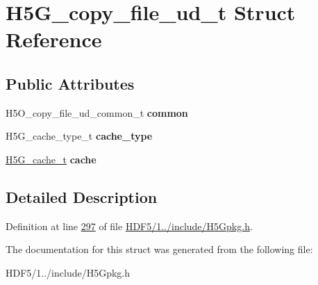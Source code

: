 \hypertarget{struct_h5_g__copy__file__ud__t}{}\section{H5\+G\+\_\+copy\+\_\+file\+\_\+ud\+\_\+t Struct Reference}
\label{struct_h5_g__copy__file__ud__t}
\subsection*{Public Attributes}
\begin{DoxyCompactItemize}
\item 
\mbox{\label{struct_h5_g__copy__file__ud__t_afb520a0b9ee20cdd295565c1ed7e0b29}} 
H5\+O\+\_\+copy\+\_\+file\+\_\+ud\+\_\+common\+\_\+t {\bfseries common}
\item 
\mbox{\label{struct_h5_g__copy__file__ud__t_a826eb22cb3d5eeb99562b8c29d128811}} 
H5\+G\+\_\+cache\+\_\+type\+\_\+t {\bfseries cache\+\_\+type}
\item 
\mbox{\label{struct_h5_g__copy__file__ud__t_a1d7b12ac9292bf4f04ad7a438f9e2013}} 
\hyperlink{union_h5_g__cache__t}{H5\+G\+\_\+cache\+\_\+t} {\bfseries cache}
\end{DoxyCompactItemize}


\subsection{Detailed Description}


Definition at line \hyperlink{_h_d_f5_21_810_81_2include_2_h5_gpkg_8h_source_l00297}{297} of file \hyperlink{_h_d_f5_21_810_81_2include_2_h5_gpkg_8h_source}{H\+D\+F5/1../include/\+H5\+Gpkg.\+h}.



The documentation for this struct was generated from the following file\+:\begin{DoxyCompactItemize}
\item 
H\+D\+F5/1../include/\+H5\+Gpkg.\+h\end{DoxyCompactItemize}
